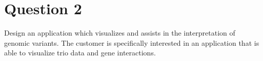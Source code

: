 \section{Question 2}
Design an application which visualizes and assists in the interpretation of genomic variants. The customer is specifically interested in an application that is able to visualize trio data and gene interactions.